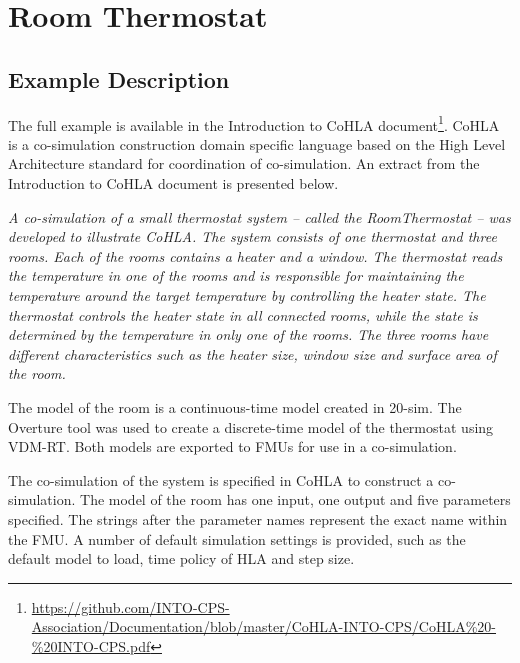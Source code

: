 \section{Room Thermostat}
\label{sec:roomThermostat}

\subsection{Example Description}
The full example is available in the Introduction to CoHLA document\footnote{\url{https://github.com/INTO-CPS-Association/Documentation/blob/master/CoHLA-INTO-CPS/CoHLA\%20-\%20INTO-CPS.pdf}}. CoHLA is a co-simulation construction domain specific language based on the High Level Architecture standard for coordination of co-simulation. An extract from the Introduction to CoHLA document is presented below.

{\itshape
  A co-simulation of a small thermostat system – called the RoomThermostat – was developed to illustrate CoHLA. The system consists of one thermostat and three rooms. Each of the rooms contains a heater and a window. The thermostat reads the temperature in one of the rooms and is responsible for maintaining the temperature around the target temperature by controlling the heater state. The thermostat controls the heater state in all connected rooms, while the state is determined by the temperature in only one of the rooms. The three rooms have different characteristics such as the heater size, window size and surface area of the room.

  The model of the room is a continuous-time model created in 20-sim. The Overture tool was used to create a discrete-time model of the thermostat using VDM-RT. Both models are exported to FMUs for use in a co-simulation.

  The co-simulation of the system is specified in CoHLA to construct a co-simulation. The model of the room has one input, one output and five parameters specified. The strings after the parameter names represent the exact name within the FMU. A number of default simulation settings is provided, such as the default model to load, time policy of HLA and step size.}
